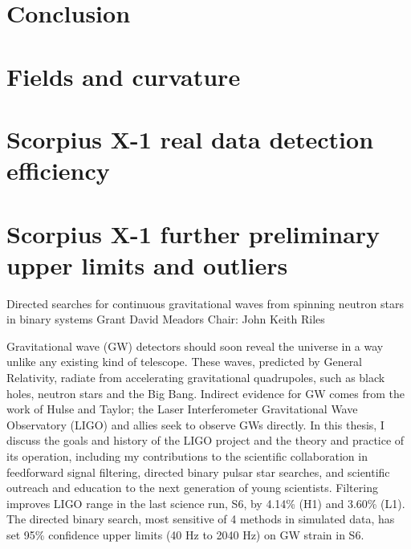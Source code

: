 \documentclass[leqno,twoside]{report}
\theoremstyle{plain}
\theoremstyle{definition}
\theoremstyle{remark}
\numberwithin{theorem}{chapter}        %
\begin{document}
\chapter{Conclusion}
\label{conclusion}



\startappendices
\chapter{Fields and curvature}
\label{appendix}

\chapter{Scorpius X-1 real data detection efficiency}
\label{appendix2}

\chapter{Scorpius X-1 further preliminary upper limits and outliers}
\label{appendix3}





\startabstractpage
{Directed searches for continuous gravitational waves from spinning neutron stars in binary systems } {Grant David Meadors} {Chair: John Keith Riles}

Gravitational wave (GW) detectors should soon reveal the universe in a way unlike any existing kind of telescope. 
These waves, predicted by General Relativity, radiate from accelerating gravitational quadrupoles, such as black holes, neutron stars and the Big Bang. 
Indirect evidence for GW comes from the work of Hulse and Taylor; the Laser Interferometer Gravitational Wave Observatory (LIGO) and allies seek to observe GWs directly. 
In this thesis, I discuss the goals and history of the LIGO project and the theory and practice of its operation, including my contributions to the scientific collaboration in feedforward signal filtering, directed binary pulsar star searches, and scientific outreach and education to the next generation of young scientists. 
Filtering improves LIGO range in the last science run, S6, by 4.14\% (H1) and 3.60\% (L1). 
The directed binary search, most sensitive of 4 methods in simulated data, has set 95\% confidence upper limits (40 Hz to 2040 Hz) on GW strain in S6.
\end{document}
